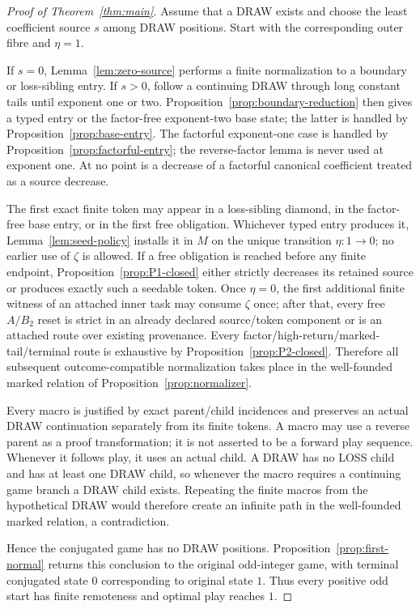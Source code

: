 \documentclass[11pt]{article}
\begin{document}
\begin{proof}[Proof of Theorem~\ref{thm:main}]
Assume that a DRAW exists and choose the least coefficient source $s$ among
DRAW positions.  Start with the corresponding outer fibre and $\eta=1$.

If $s=0$, Lemma~\ref{lem:zero-source} performs a finite normalization to a
boundary or loss-sibling entry.  If $s>0$, follow a continuing DRAW through
long constant tails until exponent one or two.  Proposition~\ref{prop:boundary-reduction}
then gives a typed entry or the factor-free exponent-two base state; the
latter is handled by Proposition~\ref{prop:base-entry}.  The factorful
exponent-one case is handled by Proposition~\ref{prop:factorful-entry}; the
reverse-factor lemma is never used at exponent one.  At no point is a
decrease of a factorful canonical coefficient treated as a source decrease.

The first exact finite token may appear in a loss-sibling diamond, in the
factor-free base entry, or in the first free obligation.  Whichever typed
entry produces it, Lemma~\ref{lem:seed-policy} installs it in $M$ on the
unique transition $\eta:1\to0$; no earlier use of $\zeta$ is allowed.  If a
free obligation is reached before any finite endpoint, Proposition~\ref{prop:P1-closed}
either strictly decreases its retained source or produces exactly such a
seedable token.  Once $\eta=0$, the first additional finite witness of an
attached inner task may consume $\zeta$ once; after that, every free
$A/B_2$ reset is strict in an already declared source/token component or is
an attached route over existing provenance.  Every factor/high-return/marked-
tail/terminal route is exhaustive by Proposition~\ref{prop:P2-closed}.
Therefore all subsequent outcome-compatible normalization takes place in the
well-founded marked relation of Proposition~\ref{prop:normalizer}.

Every macro is justified by exact parent/child incidences and preserves an
actual DRAW continuation separately from its finite tokens.  A macro may use
a reverse parent as a proof transformation; it is not asserted to be a
forward play sequence.  Whenever it follows play, it uses an actual child.
A DRAW has no LOSS child and has at least one DRAW child, so whenever the
macro requires a continuing game branch a DRAW child exists.  Repeating the finite macros from the hypothetical DRAW
would therefore create an infinite path in the well-founded marked relation,
a contradiction.

Hence the conjugated game has no DRAW positions.  Proposition~\ref{prop:first-normal}
returns this conclusion to the original odd-integer game, with terminal
conjugated state $0$ corresponding to original state $1$.  Thus every
positive odd start has finite remoteness and optimal play reaches $1$.
\end{proof}
\end{document}
